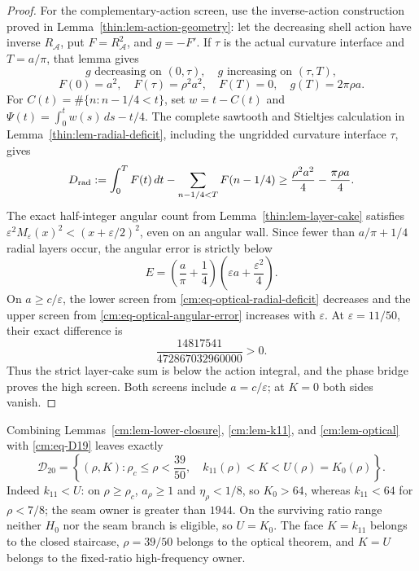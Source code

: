 \documentclass[11pt]{article}
\numberwithin{equation}{section}
\theoremstyle{definition}
\theoremstyle{remark}
\begin{document}
\begin{proof}
For the complementary-action screen, use the inverse-action construction
proved in Lemma~\ref{thin:lem-action-geometry}: let the decreasing shell
action have inverse \(R_{\mathcal A}\), put \(F=R_{\mathcal A}^2\), and
\(g=-F'\).  If \(\tau\) is the actual curvature interface and
\(T=a/\pi\), that lemma gives
\[
 g\text{ decreasing on }(0,\tau),\quad
 g\text{ increasing on }(\tau,T),
\]
\[
 F(0)=a^2,\quad F(\tau)=\rho^2a^2,\quad F(T)=0,\quad
 g(T)=2\pi\rho a.
\]
For \(C(t)=\#\{n:n-1/4<t\}\), set \(w=t-C(t)\) and
\(\Psi(t)=\int_0^tw(s)\,ds-t/4\).  The complete sawtooth and Stieltjes
calculation in Lemma~\ref{thin:lem-radial-deficit}, including the ungridded
curvature interface \(\tau\), gives
\begin{equation}
 D_{\rm rad}:=\int_0^TF(t)\,dt
 -\sum_{n-1/4<T}F(n-1/4)
 \geq\frac{\rho^2a^2}{4}-\frac{\pi\rho a}{4}.
 \label{cm:eq-optical-radial-deficit}
\end{equation}
The exact half-integer angular count from
Lemma~\ref{thin:lem-layer-cake} satisfies
\(\varepsilon^2M_\varepsilon(x)^2<(x+\varepsilon/2)^2\), even on an
angular wall.  Since fewer than \(a/\pi+1/4\) radial layers occur, the
angular error is strictly below
\begin{equation}
 E=\left(\frac a\pi+\frac14\right)
 \left(\varepsilon a+\frac{\varepsilon^2}{4}\right).
 \label{cm:eq-optical-angular-error}
\end{equation}
On \(a\geq c/\varepsilon\), the lower screen from
\eqref{cm:eq-optical-radial-deficit} decreases and the upper screen from
\eqref{cm:eq-optical-angular-error} increases with \(\varepsilon\).  At
\(\varepsilon=11/50\), their exact difference is
\begin{equation}
 \frac{14817541}{472867032960000}>0.
 \label{cm:eq-optical-high-reserve}
\end{equation}
Thus the strict layer-cake sum is below the action integral, and the phase
bridge proves the high screen.  Both screens include
\(a=c/\varepsilon\); at \(K=0\) both sides vanish.
\end{proof}

Combining Lemmas~\ref{cm:lem-lower-closure}, \ref{cm:lem-k11}, and
\ref{cm:lem-optical} with \eqref{cm:eq-D19} leaves exactly
\begin{equation}
 \boxed{
 \mathcal D_{20}=
 \left\{(\rho,K):\rho_c\leq\rho<\frac{39}{50},\quad
 k_{11}(\rho)<K<U(\rho)=K_0(\rho)\right\}.}
 \label{cm:eq-D20}
\end{equation}
Indeed \(k_{11}<U\): on \(\rho\geq\rho_c\),
\(a_\rho\geq1\) and \(\eta_\rho<1/8\), so \(K_0>64\), whereas
\(k_{11}<64\) for \(\rho<7/8\); the seam owner is greater than \(1944\).
On the surviving ratio range neither \(H_0\) nor the seam branch is
eligible, so \(U=K_0\).  The face \(K=k_{11}\) belongs to the closed
staircase, \(\rho=39/50\) belongs to the optical theorem, and \(K=U\)
belongs to the fixed-ratio high-frequency owner.
\end{document}
